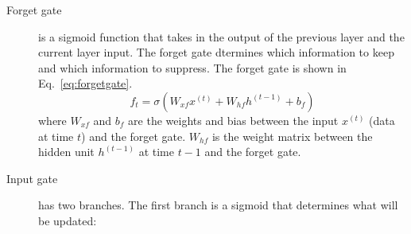 \documentclass[sigconf, nonacm, natbib, screen, balance=False]{acmart}
\begin{document}
\begin{description}
\item [Forget gate] is a sigmoid function that takes in the output of the previous layer and the current layer input. The forget gate dtermines which information to keep and which information to suppress. The forget gate is shown in Eq.~\ref{eq:forgetgate}.
%
\begin{equation}
     f_t = \sigma{(W_{xf} x^{(t)}+ W_{hf}h^{(t-1)} + b_f)} 
    \label{eq:forgetgate}
\end{equation} 
%
where $W_{xf}$ and $b_{f}$ are the weights and bias between the input $x^{(t)}$ (data at time $t$) and the forget gate. $W_{hf}$ is the weight matrix between the hidden unit $h^{(t-1)}$ at time $t-1$ and the forget gate.
\hfill\\
\item [Input gate] has two branches. The first branch is a sigmoid that determines what will be updated:


\end{description}
\end{document}
